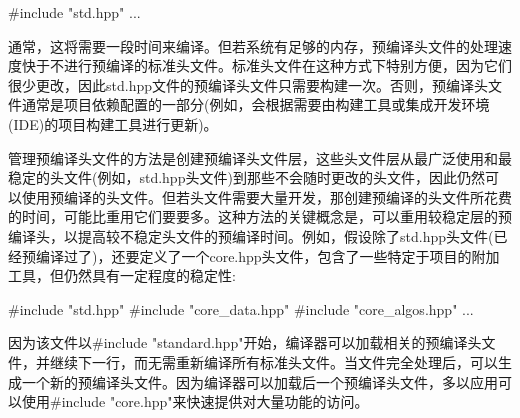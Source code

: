 \begin{cpp}
#include "std.hpp"
...
\end{cpp}

通常，这将需要一段时间来编译。但若系统有足够的内存，预编译头文件的处理速度快于不进行预编译的标准头文件。标准头文件在这种方式下特别方便，因为它们很少更改，因此std.hpp文件的预编译头文件只需要构建一次。否则，预编译头文件通常是项目依赖配置的一部分(例如，会根据需要由构建工具或集成开发环境(IDE)的项目构建工具进行更新)。

管理预编译头文件的方法是创建预编译头文件层，这些头文件层从最广泛使用和最稳定的头文件(例如，std.hpp头文件)到那些不会随时更改的头文件，因此仍然可以使用预编译的头文件。但若头文件需要大量开发，那创建预编译的头文件所花费的时间，可能比重用它们要要多。这种方法的关键概念是，可以重用较稳定层的预编译头，以提高较不稳定头文件的预编译时间。例如，假设除了std.hpp头文件(已经预编译过了)，还要定义了一个core.hpp头文件，包含了一些特定于项目的附加工具，但仍然具有一定程度的稳定性:

\begin{cpp}
#include "std.hpp"
#include "core_data.hpp"
#include "core_algos.hpp"
...
\end{cpp}

因为该文件以\#include "standard.hpp"开始，编译器可以加载相关的预编译头文件，并继续下一行，而无需重新编译所有标准头文件。当文件完全处理后，可以生成一个新的预编译头文件。因为编译器可以加载后一个预编译头文件，多以应用可以使用\#include "core.hpp"来快速提供对大量功能的访问。























